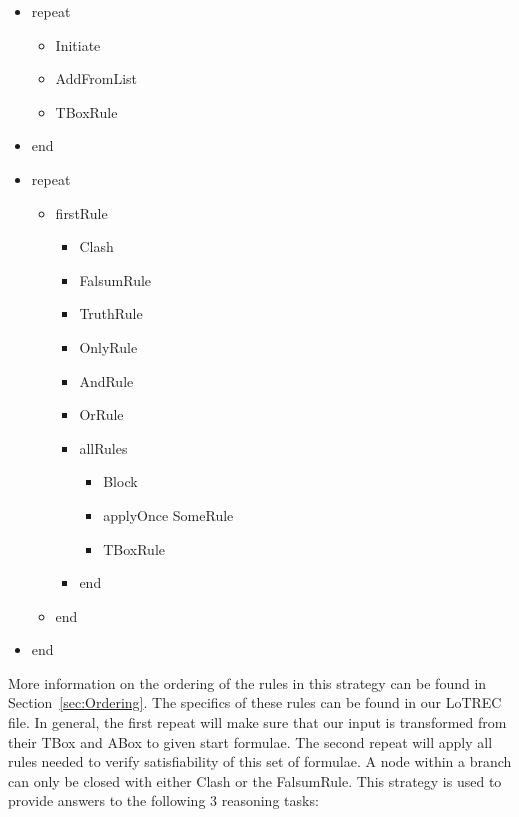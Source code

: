 \documentclass[11pt]{article} %
\begin{document}
\begin{center}
\begin{itemize}
\item repeat

\begin{itemize}
	\item Initiate
	\item AddFromList
	\item TBoxRule
\end{itemize}

\item end
\end{itemize}

\begin{itemize}
\item repeat

\begin{itemize}
	\item firstRule

\begin{itemize}
		\item Clash
		\item FalsumRule
		\item TruthRule
		\item OnlyRule
		\item AndRule
		\item OrRule
		\item allRules
		\begin{itemize}
			\item Block
			\item applyOnce SomeRule
			\item TBoxRule
		\end{itemize}
		\item end
\end{itemize}

	\item end
\end{itemize}

\item end
\end{itemize}
\end{center}

More information on the ordering of the rules in this strategy can be found in Section~\ref{sec:Ordering}. The specifics of these rules can be found in our LoTREC file. In general, the first repeat will make sure that our input is transformed from their TBox and ABox to given start formulae. The second repeat will apply all rules needed to verify satisfiability of this set of formulae. A node within a branch can only be closed with either Clash or the FalsumRule. This strategy is used to provide answers to the following 3 reasoning tasks:
\end{document}
